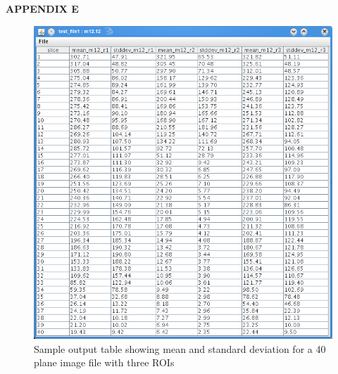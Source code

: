 \documentclass{article}
\begin{document}
\newpage
\begin{center}\LARGE{\textbf{APPENDIX E}}\end{center} 
\vfill
\begin{figure}[h]
\centering
\includegraphics[scale=0.8]{snapshot_Table.png}
\caption{Sample output table showing mean and standard deviation
for a 40 plane image file with three ROIs}
\end{figure}
\vfill
\end{document}
